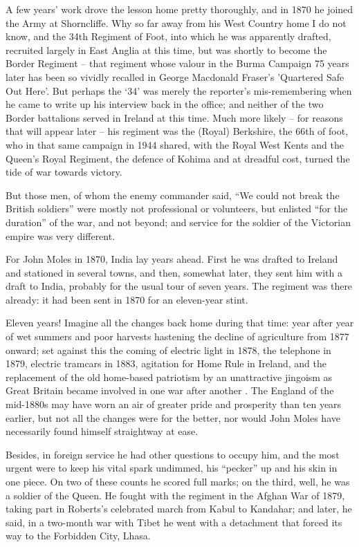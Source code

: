 A few years’ work drove the lesson home pretty thoroughly, and in 1870 he joined the Army at Shorncliffe. Why so far away from his West Country home I do not know, and the 34th Regiment of Foot, into which he was apparently drafted, recruited largely in East Anglia at this time, but was shortly to become the Border Regiment – that regiment whose valour in the Burma Campaign 75 years later has been so vividly recalled in George Macdonald Fraser’s 'Quartered Safe Out Here'. But perhaps the ‘34’ was merely the reporter’s mis-remembering when he came to write up his interview back in the office; and neither of the two Border battalions served in Ireland at this time. Much more likely – for reasons that will appear later – his regiment was the (Royal) Berkshire, the 66th of foot, who in that same campaign in 1944 shared, with the Royal West Kents and the Queen’s Royal Regiment, the defence of Kohima and at dreadful cost, turned the tide of war towards victory.

But those men, of whom the enemy commander said, “We could not break the British soldiers” were mostly not professional or volunteers, but enlisted “for the duration” of the war, and not beyond; and service for the soldier of the Victorian empire was very different.

For John Moles in 1870, India lay years ahead. First he was drafted to Ireland and stationed in several towns, and then, somewhat later, they sent him with a draft to India, probably for the usual tour of seven years. The regiment was there already: it had been sent in 1870 for an eleven-year stint.

Eleven years! Imagine all the changes back home during that time: year after year of wet summers and poor harvests hastening the decline of agriculture from 1877 onward; set against this the coming of electric light in 1878, the telephone in 1879, electric tramcars in 1883, agitation for Home Rule in Ireland, and the replacement of the old home-based patriotism by an unattractive jingoism as Great Britain became involved in one war after another . The England of the mid-1880s may have worn an air of greater pride and prosperity than ten years earlier, but not all the changes were for the better, nor would John Moles have necessarily found himself straightway at ease.

Besides, in foreign service he had other questions to occupy him, and the most urgent were to keep his vital spark undimmed, his “pecker” up and his skin in one piece. On two of these counts he scored full marks; on the third, well, he was a soldier of the Queen. He fought with the regiment in the Afghan War of 1879, taking part in Roberts’s celebrated march from Kabul to Kandahar; and later, he said, in a two-month war with Tibet he went with a detachment that forced its way to the Forbidden City, Lhasa.

